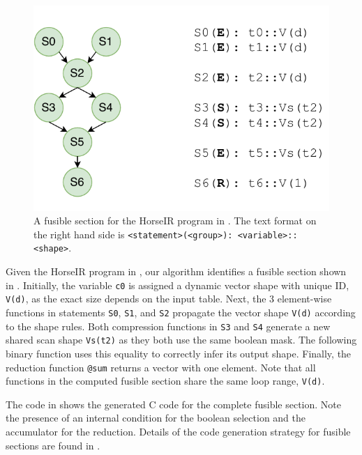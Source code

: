 \begin{figure}[htbp]
\centering
\includegraphics[width=.7\columnwidth]{./src/figure/graph-example.pdf}
\caption{A fusible section for the HorseIR program in . The
text format on the right hand side is \texttt{<statement>(<group>): <variable>::<shape>}.}
\label{fig:fusion_example}
\end{figure}

Given the HorseIR program in , our algorithm identifies a
fusible section shown in . Initially, the variable \texttt{c0}
is assigned a dynamic vector shape with unique ID, \texttt{V(d)}, as the exact size depends
on the input table. Next, the 3 element-wise functions in statements \texttt{S0},
\texttt{S1}, and \texttt{S2} propagate the vector shape \texttt{V(d)} according to the shape rules.
Both compression functions in \texttt{S3} and \texttt{S4} generate a new shared scan shape
\texttt{Vs(t2)} as they both use the same boolean mask. The following binary function
uses this equality to correctly infer its output shape. Finally, the reduction function
\texttt{@sum} returns a vector with one element. Note that all functions in the computed
fusible section share the same loop range, \texttt{V(d)}.

The code in  shows the generated C code for the complete
fusible section. Note the presence of an internal condition for the boolean selection
and the accumulator for the reduction. Details of the code generation strategy for fusible
sections are found in .


